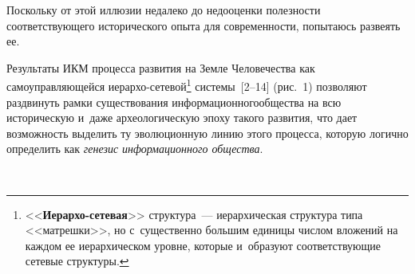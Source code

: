 \begin{multicols}{2}
Поскольку от 
этой иллюзии недалеко до недооценки полезности соответствующего 
исторического опыта для современности, попытаюсь развеять ее.
  
Результаты ИКМ процесса развития на Земле 
Человечества как самоуправляющейся ие\-рар\-хо-се\-те\-вой\footnote[3]{<<\textbf{Иерархо-сетевая}>> 
структура~--- иерархическая структура типа <<матрешки>>, но с~существенно большим 
единицы числом вложений на каждом ее иерархическом уровне, которые и~образуют 
соответствующие сетевые структуры.} системы~[2--14] (рис.~1) позволяют раздвинуть рамки 
существования информационного\linebreak общества на всю историческую и~даже археологическую эпоху такого 
развития, что дает возможность выделить ту эволюционную линию этого процесса, которую логично 
определить как \textit{генезис информационного общества}. 


\begin{figure*} %
   \vspace*{1pt}
    \begin{center}  
  \mbox{%
 \epsfxsize=130.287mm 
 }
\end{center}
\end{figure*}



\end{multicols}
